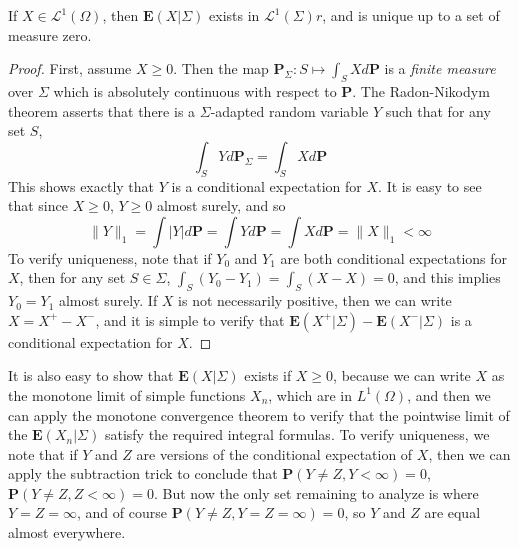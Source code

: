 
\begin{theorem}
    If $X \in \mathcal{L}^1(\Omega)$, then $\mathbf{E}(X|\Sigma)$ exists in $\mathcal{L}^1(\Sigma)r$, and is unique up to a set of measure zero.
\end{theorem}
\begin{proof}
    First, assume $X \geq 0$. Then the map $\mathbf{P}_\Sigma: S \mapsto \int_S X d \mathbf{P}$ is a {\it finite measure} over $\Sigma$ which is absolutely continuous with respect to $\mathbf{P}$. The Radon-Nikodym theorem asserts that there is a $\Sigma$-adapted random variable $Y$ such that for any set $S$,
    \[ \int_S Y d\mathbf{P}_\Sigma = \int_S X d\mathbf{P} \]
    This shows exactly that $Y$ is a conditional expectation for $X$. It is easy to see that since $X \geq 0$, $Y \geq 0$ almost surely, and so
    \[ \| Y \|_1 = \int |Y| d\mathbf{P} = \int Yd\mathbf{P} = \int Xd\mathbf{P} = \| X \|_1 < \infty \]
    To verify uniqueness, note that if $Y_0$ and $Y_1$ are both conditional expectations for $X$, then for any set $S \in \Sigma$, $\int_S (Y_0 - Y_1) = \int_S (X - X) = 0$, and this implies $Y_0 = Y_1$ almost surely. If $X$ is not necessarily positive, then we can write $X = X^+ - X^-$, and it is simple to verify that $\mathbf{E}(X^+|\Sigma) - \mathbf{E}(X^-|\Sigma)$ is a conditional expectation for $X$.
\end{proof}

It is also easy to show that $\mathbf{E}(X|\Sigma)$ exists if $X \geq 0$, because we can write $X$ as the monotone limit of simple functions $X_n$, which are in $L^1(\Omega)$, and then we can apply the monotone convergence theorem to verify that the pointwise limit of the $\mathbf{E}(X_n|\Sigma)$ satisfy the required integral formulas. To verify uniqueness, we note that if $Y$ and $Z$ are versions of the conditional expectation of $X$, then we can apply the subtraction trick to conclude that $\mathbf{P}(Y \neq Z, Y < \infty) = 0$, $\mathbf{P}(Y \neq Z, Z < \infty) = 0$. But now the only set remaining to analyze is where $Y = Z = \infty$, and of course $\mathbf{P}(Y \neq Z, Y = Z = \infty) = 0$, so $Y$ and $Z$ are equal almost everywhere.

